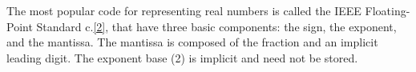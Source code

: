 \documentclass[11pt]{article}
\begin{document}
The most popular code for representing real numbers is called the IEEE Floating-Point Standard c.\ref{2}, that have three basic components: the sign, the exponent, and the mantissa. The mantissa is composed of the fraction and an implicit leading digit. The exponent base (2) is implicit and need not be stored.\\



\end{document}
